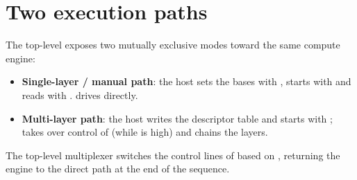 \section{Two execution paths}
The top-level exposes two mutually exclusive modes toward the same 
compute engine:
\begin{itemize}
\item \textbf{Single-layer / manual path}: the host sets the bases with
, starts with  and reads with .
 drives  directly.
\item \textbf{Multi-layer path}: the host writes the descriptor table and starts with
;  takes over control of 
(while  is high) and chains the layers.
\end{itemize}
The top-level multiplexer switches the control lines of  based on
, returning the engine to the direct path at the end of the sequence.
